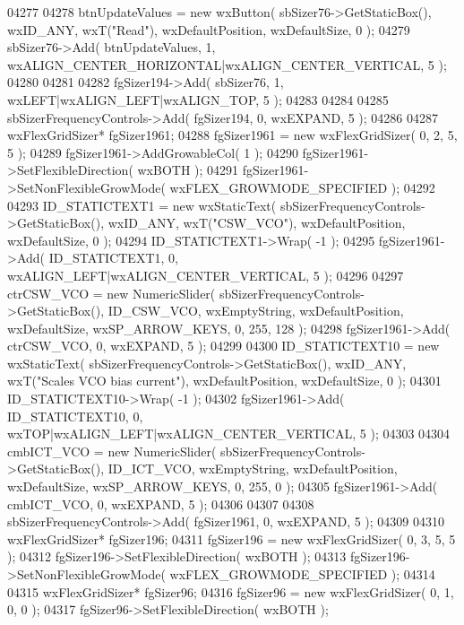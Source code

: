 \begin{DoxyCode}
04277     
04278     btnUpdateValues = \textcolor{keyword}{new} wxButton( sbSizer76->GetStaticBox(), wxID\_ANY, wxT(\textcolor{stringliteral}{"Read"}), wxDefaultPosition, 
      wxDefaultSize, 0 );
04279     sbSizer76->Add( btnUpdateValues, 1, wxALIGN\_CENTER\_HORIZONTAL|wxALIGN\_CENTER\_VERTICAL, 5 );
04280     
04281     
04282     fgSizer194->Add( sbSizer76, 1, wxLEFT|wxALIGN\_LEFT|wxALIGN\_TOP, 5 );
04283     
04284     
04285     sbSizerFrequencyControls->Add( fgSizer194, 0, wxEXPAND, 5 );
04286     
04287     wxFlexGridSizer* fgSizer1961;
04288     fgSizer1961 = \textcolor{keyword}{new} wxFlexGridSizer( 0, 2, 5, 5 );
04289     fgSizer1961->AddGrowableCol( 1 );
04290     fgSizer1961->SetFlexibleDirection( wxBOTH );
04291     fgSizer1961->SetNonFlexibleGrowMode( wxFLEX\_GROWMODE\_SPECIFIED );
04292     
04293     ID_STATICTEXT1 = \textcolor{keyword}{new} wxStaticText( sbSizerFrequencyControls->GetStaticBox(), wxID\_ANY, wxT(\textcolor{stringliteral}{"CSW\_VCO"}), 
      wxDefaultPosition, wxDefaultSize, 0 );
04294     ID_STATICTEXT1->Wrap( -1 );
04295     fgSizer1961->Add( ID_STATICTEXT1, 0, wxALIGN\_LEFT|wxALIGN\_CENTER\_VERTICAL, 5 );
04296     
04297     ctrCSW_VCO = \textcolor{keyword}{new} NumericSlider( sbSizerFrequencyControls->GetStaticBox(), 
      ID_CSW_VCO, wxEmptyString, wxDefaultPosition, wxDefaultSize, wxSP\_ARROW\_KEYS, 0, 255, 128 );
04298     fgSizer1961->Add( ctrCSW_VCO, 0, wxEXPAND, 5 );
04299     
04300     ID_STATICTEXT10 = \textcolor{keyword}{new} wxStaticText( sbSizerFrequencyControls->GetStaticBox(), wxID\_ANY, wxT(\textcolor{stringliteral}{"Scales VCO
       bias current"}), wxDefaultPosition, wxDefaultSize, 0 );
04301     ID_STATICTEXT10->Wrap( -1 );
04302     fgSizer1961->Add( ID_STATICTEXT10, 0, wxTOP|wxALIGN\_LEFT|wxALIGN\_CENTER\_VERTICAL, 5 );
04303     
04304     cmbICT_VCO = \textcolor{keyword}{new} NumericSlider( sbSizerFrequencyControls->GetStaticBox(), 
      ID_ICT_VCO, wxEmptyString, wxDefaultPosition, wxDefaultSize, wxSP\_ARROW\_KEYS, 0, 255, 0 );
04305     fgSizer1961->Add( cmbICT_VCO, 0, wxEXPAND, 5 );
04306     
04307     
04308     sbSizerFrequencyControls->Add( fgSizer1961, 0, wxEXPAND, 5 );
04309     
04310     wxFlexGridSizer* fgSizer196;
04311     fgSizer196 = \textcolor{keyword}{new} wxFlexGridSizer( 0, 3, 5, 5 );
04312     fgSizer196->SetFlexibleDirection( wxBOTH );
04313     fgSizer196->SetNonFlexibleGrowMode( wxFLEX\_GROWMODE\_SPECIFIED );
04314     
04315     wxFlexGridSizer* fgSizer96;
04316     fgSizer96 = \textcolor{keyword}{new} wxFlexGridSizer( 0, 1, 0, 0 );
04317     fgSizer96->SetFlexibleDirection( wxBOTH );

\end{DoxyCode}
